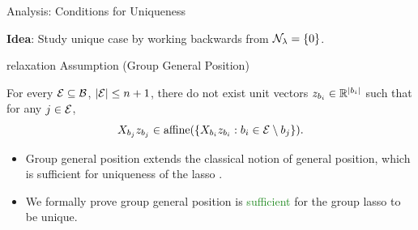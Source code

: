 \documentclass[usenames,dvipsnames,mathserif,notheorems]{beamer}
\newcommand{\green}[1]{\textcolor{ForestGreen}{#1}}
\begin{document}
\begin{frame}{Analysis: Conditions for Uniqueness}

	\textbf{Idea}: Study unique case by working backwards from \( \mathcal{N}_\lambda = \left\{0\right\} \).

	\vspace{1em}
	\pause

	\begin{beamercolorbox}[wd=\textwidth,sep=1em]{relaxation}
		Assumption (Group General Position)

		For every \( \mathcal{E} \subseteq \mathcal{B} \), \( \left\vert \mathcal{E}\right\vert \leq n +1 \),
		there do not exist unit vectors \( z_{b_i} \in \mathbb{R}^{\left\vert {b_i}\right\vert} \)
		such that for any \( j \in \mathcal{E} \),
		\[
			X_{b_j} z_{b_j} \in
			\text{affine}(\left\{X_{b_i} z_{b_i} : {b_i} \in \mathcal{E} \setminus b_j\right\}).
		\]
	\end{beamercolorbox}
	\vspace{1em}
	\pause

	\begin{itemize}
		\item Group general position extends the classical notion of general
		      position, which is sufficient for uniqueness of the lasso \citep{tibshirani2013unique}.
		      \pause

		\item We formally prove group general position is \green{sufficient} for the
		      group lasso to be unique.
	\end{itemize}

\end{frame}
\end{document}
